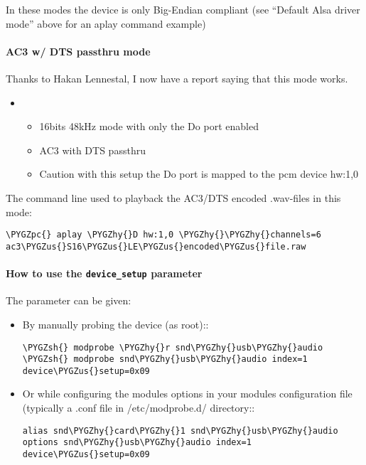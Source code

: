 \documentclass[a4paper,8pt,english]{sphinxmanual}
\def\PYGZus{\char`\_}
\def\PYGZsh{\char`\#}
\def\PYGZpc{\char`\%}
\def\PYGZhy{\char`\-}
\begin{document}
In these modes the device is only Big-Endian compliant (see ``Default Alsa driver
mode'' above for an aplay command example)


\paragraph{AC3 w/ DTS passthru mode}
\label{sound/cards/audiophile-usb:ac3-w-dts-passthru-mode}
Thanks to Hakan Lennestal, I now have a report saying that this mode works.
\begin{itemize}
\item {} 
\begin{itemize}
\item {} 
16bits 48kHz mode with only the Do port enabled

\item {} 
AC3 with DTS passthru

\item {} 
Caution with this setup the Do port is mapped to the pcm device hw:1,0

\end{itemize}

\end{itemize}

The command line used to playback the AC3/DTS encoded .wav-files in this mode:

\begin{Verbatim}[commandchars=\\\{\}]
\PYGZpc{} aplay \PYGZhy{}D hw:1,0 \PYGZhy{}\PYGZhy{}channels=6 ac3\PYGZus{}S16\PYGZus{}LE\PYGZus{}encoded\PYGZus{}file.raw
\end{Verbatim}


\paragraph{How to use the \texttt{device\_setup} parameter}
\label{sound/cards/audiophile-usb:how-to-use-the-device-setup-parameter}
The parameter can be given:
\begin{itemize}
\item {} 
By manually probing the device (as root)::

\begin{Verbatim}[commandchars=\\\{\}]
\PYGZsh{} modprobe \PYGZhy{}r snd\PYGZhy{}usb\PYGZhy{}audio
\PYGZsh{} modprobe snd\PYGZhy{}usb\PYGZhy{}audio index=1 device\PYGZus{}setup=0x09
\end{Verbatim}

\item {} 
Or while configuring the modules options in your modules configuration file
(typically a .conf file in /etc/modprobe.d/ directory::

\begin{Verbatim}[commandchars=\\\{\}]
alias snd\PYGZhy{}card\PYGZhy{}1 snd\PYGZhy{}usb\PYGZhy{}audio
options snd\PYGZhy{}usb\PYGZhy{}audio index=1 device\PYGZus{}setup=0x09
\end{Verbatim}

\end{itemize}
\end{document}
